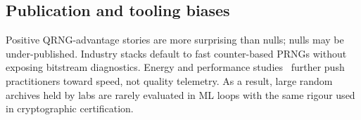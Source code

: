 \subsection{Publication and tooling biases}

Positive QRNG-advantage stories are more surprising than nulls; nulls may be under-published.
Industry stacks default to fast counter-based PRNGs without exposing bitstream diagnostics.
Energy and performance studies~\cite{antunes2024reproducibility} further push practitioners toward speed, not quality telemetry.
As a result, large random archives held by labs are rarely evaluated in ML loops with the same rigour used in cryptographic certification.
